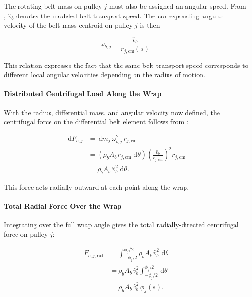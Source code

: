 \documentclass[11pt]{article}
\numberwithin{equation}{section}
\newcommand{\dd}{\,\mathrm{d}}
\newcounter{theory}
\begin{document}
The rotating belt mass on pulley \(j\) must also be assigned an angular speed.
From , \(\hat{v}_b\) denotes the modeled belt transport speed. 
The corresponding angular velocity of the belt mass centroid
on pulley \(j\) is then

\begin{equation}
\omega_{b,j}
=
\frac{\hat{v}_b}{r_{j,\mathrm{cm}}(s)}.
\label{eq:omega_bj_definition}
\end{equation}

This relation expresses the fact that the same belt transport speed corresponds
to different local angular velocities depending on the radius of motion. 

\paragraph{Distributed Centrifugal Load Along the Wrap}

With the radius, differential mass, and angular velocity now defined,
the centrifugal force on the differential belt element follows from
:

\begin{align}
\dd F_{c,j}
&=
\dd m_j\,\omega_{b,j}^2\,r_{j,\mathrm{cm}}
\nonumber\\[6pt]
&=
\left(\rho_b A_b\,r_{j,\mathrm{cm}}\,\dd\theta\right)
\left(\frac{\hat{v}_b}{r_{j,\mathrm{cm}}}\right)^2
r_{j,\mathrm{cm}}
\nonumber\\[6pt]
&=
\rho_b A_b\,\hat{v}_b^2\,\dd\theta.
\label{eq:dFc_belt_j}
\end{align}

This force acts radially outward at each point along the wrap.

\paragraph{Total Radial Force Over the Wrap}

Integrating  over the full wrap angle gives the total
radially-directed centrifugal force on pulley \(j\):

\begin{align}
F_{c,j,\mathrm{rad}}
&=
\int_{-\phi_j/2}^{\phi_j/2}
\rho_b A_b\,\hat{v}_b^2\,\dd\theta
\nonumber\\[6pt]
&=
\rho_b A_b\,\hat{v}_b^2
\int_{-\phi_j/2}^{\phi_j/2}\dd\theta
\nonumber\\[6pt]
&=
\rho_b A_b\,\hat{v}_b^2\,\phi_j(s).
\label{eq:Fc_rad_wrap_j}
\end{align}
\end{document}
